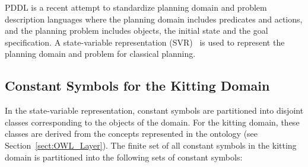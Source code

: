 PDDL is a recent attempt to standardize planning domain and problem description languages where the planning domain includes predicates and actions, and the planning problem includes objects, the initial state and the goal specification. A state-variable representation (SVR)~\cite{NAU.2004} is used to represent the planning domain and problem for classical planning.

\subsection{Constant Symbols for the Kitting Domain}
In the state-variable representation, constant symbols are partitioned into disjoint classes corresponding to the objects of the domain. For the kitting domain, these classes are derived from the concepts represented in the ontology (see Section~\ref{sect:OWL_Layer}). The finite set of all constant symbols in the kitting domain is partitioned into the following sets of constant symbols:


